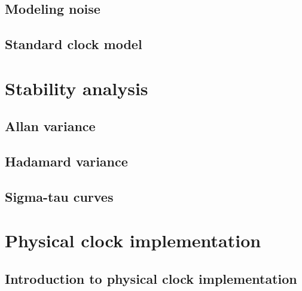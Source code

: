 \subsection{Modeling noise}

\subsection{Standard clock model}


\section{Stability analysis}

\subsection{Allan variance}

\subsection{Hadamard variance}

\subsection{Sigma-tau curves}



\section{Physical clock implementation}

\subsection{Introduction to physical clock implementation}


